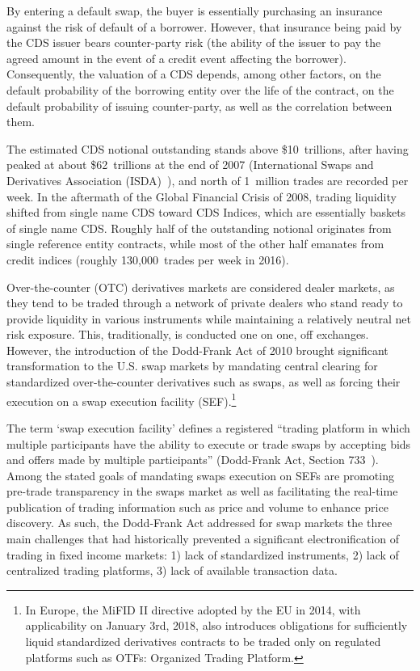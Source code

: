 By entering a default swap, the buyer is essentially purchasing an insurance against the risk of default of a borrower. However, that insurance being paid by the CDS issuer bears counter-party risk (the ability of the issuer to pay the agreed amount in the event of a credit event affecting the borrower). Consequently, the valuation of a CDS depends, among other factors, on the default probability of the borrowing entity over the life of the contract, on the default probability of issuing counter-party, as well as the correlation between them.


The estimated CDS notional outstanding stands above \$10~trillions, after having peaked at about \$62~trillions at the end of 2007 (International Swaps and Derivatives Association (ISDA)~\cite{ISDA}), and north of 1~million trades are recorded per week. In the aftermath of the Global Financial Crisis of 2008, trading liquidity shifted from single name CDS toward CDS Indices, which are essentially baskets of single name CDS. Roughly half of the outstanding notional originates from single reference entity contracts, while most of the other half emanates from credit indices (roughly 130,000~trades per week in 2016).


Over-the-counter (OTC) derivatives markets are considered dealer markets, as they tend to be traded through a network of private dealers who stand ready to provide liquidity in various instruments while maintaining a relatively neutral net risk exposure. This, traditionally, is conducted one on one, off exchanges. However, the introduction of the Dodd-Frank Act of 2010 brought significant transformation to the U.S. swap markets by mandating central clearing for standardized over-the-counter derivatives such as swaps, as well as forcing their execution on a swap execution facility (SEF).\footnote{In Europe, the MiFID II directive adopted by the EU in 2014, with applicability on January 3rd, 2018, also introduces obligations for sufficiently liquid standardized derivatives contracts to be traded only on regulated platforms such as OTFs: Organized Trading Platform.}


The term `swap execution facility' defines a registered ``trading platform in which multiple participants have the ability to execute or trade swaps by accepting bids and offers made by multiple participants'' (Dodd-Frank Act, Section 733~\cite{DoddFrank}). Among the stated goals of mandating swaps execution on SEFs are promoting pre-trade transparency in the swaps market as well as facilitating the real-time publication of trading information such as price and volume to enhance price discovery. As such, the Dodd-Frank Act addressed for swap markets the three main challenges that had historically prevented a significant electronification of trading in fixed income markets: 1) lack of standardized instruments, 2) lack of centralized trading platforms, 3) lack of available transaction data.


